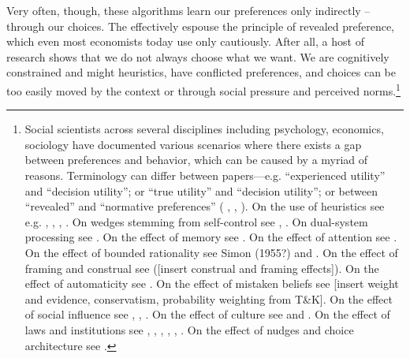 \documentclass[12pt,letterpaper]{article}
\begin{document}
Very often, though, these algorithms learn our preferences only indirectly -- through our choices. The effectively espouse the principle of revealed preference, which even most economists today use only cautiously. After all, a host of research shows that we do not always choose what we want. We are cognitively constrained and might heuristics, have conflicted preferences, and choices can be too easily moved by the context or through social pressure and perceived norms.\footnote{Social scientists across several disciplines including psychology, economics, sociology have documented various scenarios where there exists a gap between preferences and behavior, which can be caused by a myriad of reasons. Terminology can differ between papers---e.g. “experienced utility” and “decision utility”; or “true utility” and “decision utility”; or between “revealed” and “normative preferences” ( \citealt{kahneman1991economic}, \citealt{beshears2008preferences}, \citealt{bernheim2009beyond}). On the use of heuristics see e.g. \citealt{tversky1974judgment}, \citealt{shah2008heuristics}, \citealt{gigerenzer2008heuristics}, \citealt{bordalo2016stereotypes}. On wedges stemming from self-control see \citealt{mischel1989delay}, \citealt{kruglanski2002theory}. On dual-system processing see \citealt{kahneman2011thinking}. On the effect of memory see \citealt{stewart2006decision}. On the effect of attention see \citealt{gabaix2019behavioral}. On the effect of bounded rationality see Simon (1955?) and \citealt{conlisk1996bounded}. On the effect of framing and construal see ([insert construal and framing effects]). On the effect of automaticity see \citealt{dijksterhuis2006making}. On the effect of mistaken beliefs see \citealt{benjamin2019errors} [insert weight and evidence, conservatism, probability weighting from T\&K]. On the effect of social influence see \citealt{asch1951effects}, \citealt{milgram1978obedience}, \citealt{cialdini2004social}. On the effect of culture see \citealt{yamagishi2008preferences} and \citealt{henrich2010beyond}. On the effect of laws and institutions see \citealt{feagin1980discrimination}, \citealt{massey1993american}, \citealt{pager2008sociology}, \citealt{reskin2012race}, \citealt{small2020sociological}, \citealt{north1991institutions}. On the effect of nudges and choice architecture see \citealt{thaler2009nudge}.} 
\end{document}
